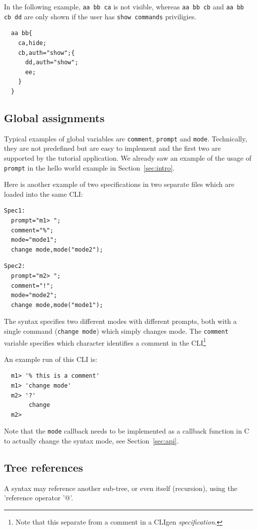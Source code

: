 \documentclass[a4paper, 10pt] {article}
\begin{document}
In the following example, {\tt aa bb ca} is not visible,
whereas {\tt aa bb cb} and {\tt aa bb cb dd} are only shown if the
user has {\tt show commands} priviligies.
\begin{verbatim}
  aa bb{
    ca,hide;
    cb,auth="show";{
      dd,auth="show";
      ee;
    }
  }
\end{verbatim}

\subsection{Global assignments}
Typical examples of global variables are {\tt comment}, {\tt prompt}
and {\tt mode}.  Technically, they are not predefined but are easy to
implement and the first two are supported by the tutorial
application. We already saw an example of the usage of {\tt prompt} in
the hello world example in Section~\ref{sec:intro}.

Here is another example of two specifications in two separate files which are loaded into
the same CLI:
\begin{verbatim}
Spec1:
  prompt="m1> ";
  comment="%";
  mode="mode1";
  change mode,mode("mode2");
\end{verbatim}
\begin{verbatim}
Spec2:
  prompt="m2> ";
  comment="!";
  mode="mode2";
  change mode,mode("mode1");
\end{verbatim}
The syntax specifies two different modes with different prompts, both
with a single command ({\tt change mode}) which simply changes
mode. The {\tt comment} variable specifies which character identifies a comment in the CLI\footnote{Note that this separate from a comment in a CLIgen \emph{specification}.}

An example run of this CLI is:
\begin{verbatim}
  m1> '% this is a comment'
  m1> 'change mode'
  m2> '?'
       change
  m2>
\end{verbatim}

Note that the {\tt mode} callback needs to be implemented as a
callback function in C to actually change the syntax mode, see
Section~\ref{sec:api}.

\subsection{Tree references}

A syntax may reference another sub-tree, or even itself (recursion), using the 'reference operator '@'.
\end{document}
